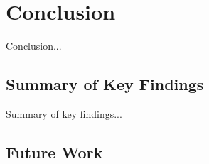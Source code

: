 \chapter{Conclusion}
\label{chap:conclusion}

Conclusion...

\section{Summary of Key Findings}
\label{sec:summary}

Summary of key findings...

\section{Future Work}
\label{sec:future}
